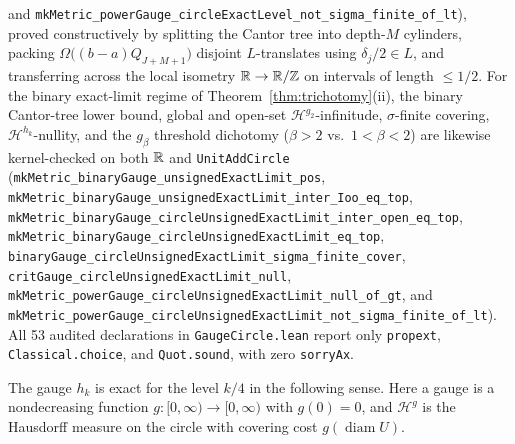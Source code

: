and
\texttt{mkMetric\_\allowbreak powerGauge\_\allowbreak circleExactLevel\_\allowbreak not\_\allowbreak sigma\_\allowbreak finite\_\allowbreak of\_\allowbreak lt}),
proved constructively by splitting the Cantor tree into depth-$M$ cylinders,
packing $\Omega\bigl((b-a)Q_{J+M+1}\bigr)$ disjoint $L$-translates using
$\delta_j/2\in L$, and transferring across the local isometry
$\mathbb{R}\to\mathbb{R}/\mathbb{Z}$ on intervals of length $\le1/2$. For the binary exact-limit
regime of Theorem~\ref{thm:trichotomy}(ii), the binary Cantor-tree lower bound,
global and open-set $\mathcal H^{g_2}$-infinitude, $\sigma$-finite covering,
$\mathcal H^{h_k}$-nullity, and the $g_\beta$ threshold dichotomy ($\beta>2$ vs.\
$1<\beta<2$) are likewise kernel-checked on both $\mathbb{R}$ and \texttt{UnitAddCircle}
(\texttt{mkMetric\_\allowbreak binaryGauge\_\allowbreak unsigned\allowbreak ExactLimit\_\allowbreak pos},
\texttt{mkMetric\_\allowbreak binaryGauge\_\allowbreak unsigned\allowbreak ExactLimit\_\allowbreak inter\_\allowbreak Ioo\_\allowbreak eq\_\allowbreak top},
\texttt{mkMetric\_\allowbreak binaryGauge\_\allowbreak circle\allowbreak Unsigned\allowbreak ExactLimit\_\allowbreak inter\_\allowbreak open\_\allowbreak eq\_\allowbreak top},
\texttt{mkMetric\_\allowbreak binaryGauge\_\allowbreak circle\allowbreak Unsigned\allowbreak ExactLimit\_\allowbreak eq\_\allowbreak top},
\texttt{binaryGauge\_\allowbreak circle\allowbreak Unsigned\allowbreak ExactLimit\_\allowbreak sigma\_\allowbreak finite\_\allowbreak cover},
\texttt{critGauge\_\allowbreak circle\allowbreak Unsigned\allowbreak ExactLimit\_\allowbreak null},
\texttt{mkMetric\_\allowbreak powerGauge\_\allowbreak circle\allowbreak Unsigned\allowbreak ExactLimit\_\allowbreak null\_\allowbreak of\_\allowbreak gt},
and
\texttt{mkMetric\_\allowbreak powerGauge\_\allowbreak circle\allowbreak Unsigned\allowbreak ExactLimit\_\allowbreak not\_\allowbreak sigma\_\allowbreak finite\_\allowbreak of\_\allowbreak lt}).
All 53 audited declarations in \texttt{GaugeCircle.lean} report only
\texttt{propext}, \texttt{Classical.choice}, and \texttt{Quot.sound}, with zero
\texttt{sorryAx}.

The gauge $h_k$ is exact for the level $k/4$ in the following sense.
Here a gauge is a nondecreasing function $g:[0,\infty)\to[0,\infty)$
with $g(0)=0$, and $\mathcal H^g$ is the Hausdorff measure on the circle
with covering cost $g(\operatorname{diam}U)$.

